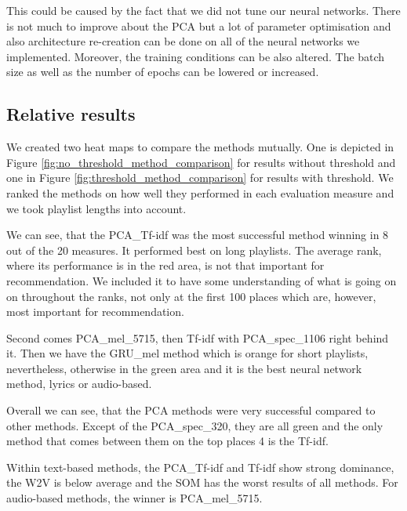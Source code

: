 This could be caused by the fact that we did not tune our neural networks. There is not much to improve about the PCA but a lot of parameter optimisation and also architecture re-creation can be done on all of the neural networks we implemented. Moreover, the training conditions can be also altered. The batch size as well as the number of epochs can be lowered or increased. 

\subsection{Relative results}\label{ssec:relative_comparison}

We created two heat maps to compare the methods mutually. One is depicted in Figure \ref{fig:no_threshold_method_comparison} for results without threshold and one in Figure \ref{fig:threshold_method_comparison} for results with threshold. We ranked the methods on how well they performed in each evaluation measure and we took playlist lengths into account. 

We can see, that the PCA\_Tf-idf was the most successful method winning in 8 out of the 20 measures. It performed best on long playlists. The average rank, where its performance is in the red area, is not that important for recommendation. We included it to have some understanding of what is going on on throughout the ranks, not only at the first 100 places which are, however, most important for recommendation.

Second comes PCA\_mel\_5715, then Tf-idf with PCA\_spec\_1106 right behind it. Then we have the GRU\_mel method which is orange for short playlists, nevertheless, otherwise in the green area and it is the best neural network method, lyrics or audio-based. 

Overall we can see, that the PCA methods were very successful compared to other methods. Except of the PCA\_spec\_320, they are all green and the only method that comes between them on the top places 4 is the Tf-idf. 

Within text-based methods, the PCA\_Tf-idf and Tf-idf show strong dominance, the W2V is below average and the SOM has the worst results of all methods. For audio-based methods, the winner is PCA\_mel\_5715. \\

